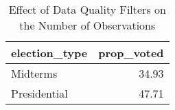 \begin{table}[!htb]
\centering
\caption{Effect of Data Quality Filters on the Number of Observations} 
\label{table:midterm_pres}
\begingroup\small
\begin{tabular}{lr}
  \hline
election\_type & prop\_voted \\ 
  \hline
Midterms & 34.93 \\ 
  Presidential & 47.71 \\ 
   \hline
\end{tabular}
\endgroup
\end{table}
